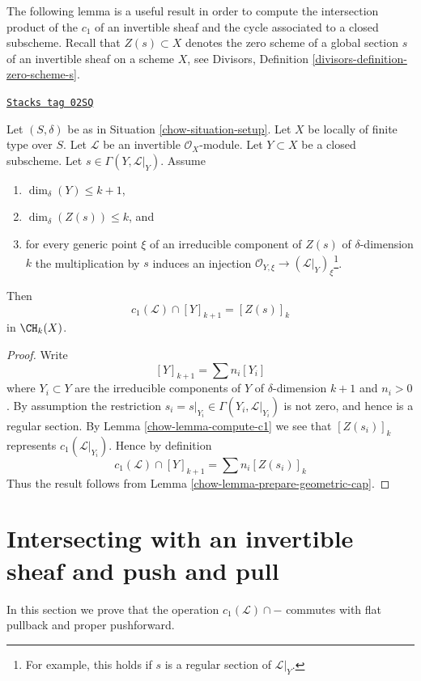 The following lemma is a useful result in order to compute the intersection
product of the $c_1$ of an invertible sheaf and the cycle associated
to a closed subscheme.
Recall that $Z(s) \subset X$ denotes the zero scheme of a global section
$s$ of an invertible sheaf on a scheme $X$, see
Divisors, Definition \ref{divisors-definition-zero-scheme-s}.

\begin{lemma}
\label{chow-lemma-geometric-cap}
\href{https://stacks.math.columbia.edu/tag/02SQ}{\texttt{Stacks tag 02SQ}}

Let $(S, \delta)$ be as in Situation \ref{chow-situation-setup}.
Let $X$ be locally of finite type over $S$.
Let $\mathcal{L}$ be an invertible $\mathcal{O}_X$-module.
Let $Y \subset X$ be a closed subscheme.
Let $s \in \Gamma(Y, \mathcal{L}|_Y)$.
Assume
\begin{enumerate}
\item $\dim_\delta(Y) \leq k + 1$,
\item $\dim_\delta(Z(s)) \leq k$, and
\item for every generic point $\xi$ of an irreducible component of
$Z(s)$ of $\delta$-dimension $k$ the multiplication by $s$
induces an injection
$\mathcal{O}_{Y, \xi} \to (\mathcal{L}|_Y)_\xi$\footnote{For example,
this holds if $s$ is a regular section of $\mathcal{L}|_Y$.}.
\end{enumerate}
Then
$$
c_1(\mathcal{L}) \cap [Y]_{k + 1} = [Z(s)]_k
$$
in $\CH_k(X)$.
\end{lemma}

\begin{proof}

Write
$$
[Y]_{k + 1} = \sum n_i[Y_i]
$$
where $Y_i \subset Y$ are the irreducible components of
$Y$ of $\delta$-dimension $k + 1$ and $n_i > 0$.
By assumption the restriction
$s_i = s|_{Y_i} \in \Gamma(Y_i, \mathcal{L}|_{Y_i})$ is not
zero, and hence is a regular section. By Lemma \ref{chow-lemma-compute-c1}
we see that $[Z(s_i)]_k$ represents $c_1(\mathcal{L}|_{Y_i})$.
Hence by definition
$$
c_1(\mathcal{L}) \cap [Y]_{k + 1} = \sum n_i[Z(s_i)]_k
$$
Thus the result follows from Lemma \ref{chow-lemma-prepare-geometric-cap}.
\end{proof}

\section{Intersecting with an invertible sheaf and push and pull}
\label{chow-section-intersecting-with-divisors-push-pull}
In this section we prove that the operation $c_1(\mathcal{L}) \cap -$
commutes with flat pullback and proper pushforward.

